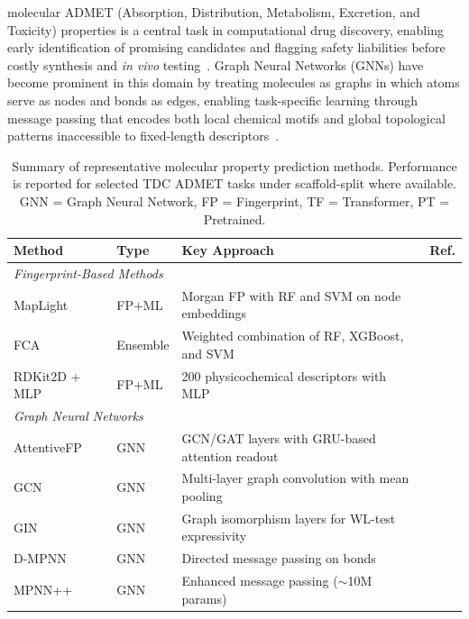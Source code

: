 \documentclass[journal]{IEEEtran}
\begin{document}
 molecular ADMET (Absorption, Distribution, Metabolism, Excretion, and Toxicity) properties is a central task in computational drug discovery, enabling early identification of promising candidates and flagging safety liabilities before costly synthesis and \emph{in vivo} testing~\cite{zhang2025admet}. Graph Neural Networks (GNNs) have become prominent in this domain by treating molecules as graphs in which atoms serve as nodes and bonds as edges, enabling task-specific learning through message passing that encodes both local chemical motifs and global topological patterns inaccessible to fixed-length descriptors~\cite{gilmer2017neural, yang2019dmpnn, attentiveFP}.

\begin{table}[!t]
\centering
\caption{Summary of representative molecular property prediction methods. Performance is reported for selected TDC ADMET tasks under scaffold-split where available. GNN = Graph Neural Network, FP = Fingerprint, TF = Transformer, PT = Pretrained.}
\label{tab:related_work_summary}
\scriptsize
\begin{tabular}{llp{5.5cm}l}
\toprule
\textbf{Method} & \textbf{Type} & \textbf{Key Approach} & \textbf{Ref.} \\
\midrule

\multicolumn{4}{l}{\emph{Fingerprint-Based Methods}} \\
\midrule
MapLight & FP+ML & Morgan FP with RF and SVM on node embeddings & \cite{maplight} \\
FCA & Ensemble & Weighted combination of RF, XGBoost, and SVM & \cite{cfa} \\
RDKit2D + MLP & FP+ML & 200 physicochemical descriptors with MLP & \cite{rdkit2d_mlp} \\

\midrule
\multicolumn{4}{l}{\emph{Graph Neural Networks}} \\
\midrule
AttentiveFP & GNN & GCN/GAT layers with GRU-based attention readout & \cite{attentiveFP} \\
GCN & GNN & Multi-layer graph convolution with mean pooling & \cite{kipf2017gcn} \\
GIN & GNN & Graph isomorphism layers for WL-test expressivity & \cite{xu2019gin} \\
D-MPNN & GNN & Directed message passing on bonds & \cite{yang2019dmpnn} \\
MPNN++ & GNN & Enhanced message passing ($\sim$10M params) & \cite{miniMol} \\


\end{tabular}
\end{table}
\end{document}
